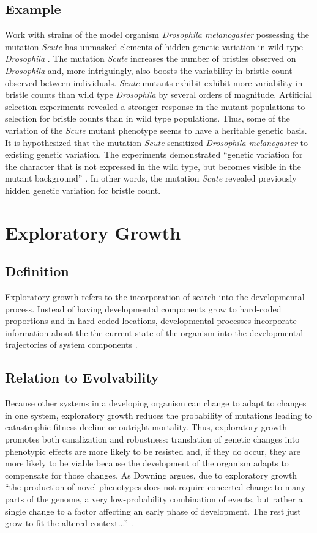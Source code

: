 \subsection{Example}
Work with strains of the model organism \textit{Drosophila melanogaster} possessing the mutation \textit{Scute} has unmasked elements of hidden genetic variation in wild type \textit{Drosophila} \cite{Wagner2003EvolutionaryUnveiled}.
The mutation \textit{Scute} increases the number of bristles observed on \textit{Drosophila} and, more intriguingly, also boosts the variability in bristle count observed between individuals.
\textit{Scute} mutants exhibit exhibit more variability in bristle counts than wild type \textit{Drosophila} by several orders of magnitude.
Artificial selection experiments revealed a stronger response in the mutant populations to selection for bristle counts than in wild type populations.
Thus, some of the variation of the \textit{Scute} mutant phenotype seems to have a heritable genetic basis.
It is hypothesized that the mutation \textit{Scute} sensitized \textit{Drosophila melanogaster} to existing genetic variation. The experiments demonstrated ``genetic variation for the character that is not expressed in the wild type, but becomes visible in the mutant background'' \cite{Wagner2003EvolutionaryUnveiled}. In other words, the mutation \textit{Scute} revealed previously hidden genetic variation for bristle count.

\section{Exploratory Growth}
\subsection{Definition}
Exploratory growth refers to the incorporation of search into the developmental process. Instead of having developmental components grow to hard-coded proportions and in hard-coded locations, developmental processes incorporate information about the the current state of the organism into the developmental trajectories of system components \cite[p 214]{Downing2015IntelligenceSystems}.

\subsection{Relation to Evolvability}
Because other systems in a developing organism can change to adapt to changes in one system, exploratory growth reduces the probability of mutations leading to catastrophic fitness decline or outright mortality. Thus, exploratory growth promotes both canalization and robustness: translation of genetic changes into phenotypic effects are more likely to be resisted and, if they do occur, they are more likely to be viable because the development of the organism adapts to compensate for those changes. As Downing argues, due to exploratory growth ``the production of novel phenotypes does not require concerted change to many parts of the genome, a very low-probability combination of events, but rather a single change to a factor affecting an early phase of development. The rest just grow to fit the altered context...'' \cite[p 214]{Downing2015IntelligenceSystems}.

